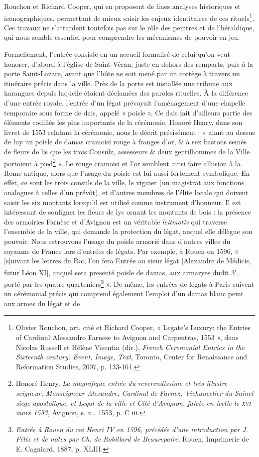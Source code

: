\documentclass[12pt,twoside,openany]{book}
\begin{document}
Rouchon et Richard Cooper, qui en proposent de fines analyses historiques et iconographiques, permettant de mieux saisir les enjeux identitaires de ces rituels\footnote{Olivier Rouchon, art. cité et Richard Cooper, « Legate’s Luxury: the Entries of Cardinal Alessandro Farnese to Avignon and Carpentras, 1553 », dans Nicolas Russell et Hélène Visentin (dir.), \textit{French Ceremonial Entries in the Sixteenth century: Event, Image, Text}, Toronto, Center for Renaissance and Reformation Studies, 2007, p. 133-161.}. Ces travaux ne s’attardent toutefois pas sur le rôle des peintres et de l’héraldique, qui nous semble essentiel pour comprendre les mécanismes de pouvoir en jeu.

Formellement, l’entrée consiste en un accueil formalisé de celui qu’on veut honorer, d’abord à l’église de Saint-Véran, juste en-dehors des remparts, puis à la porte Saint-Lazare, avant que l’hôte ne soit mené par un cortège à travers un itinéraire précis dans la ville. Près de la porte est installée une tribune aux harangues depuis laquelle étaient déclamées des paroles rituelles. À la différence d’une entrée royale, l’entrée d’un légat prévoyait l’aménagement d’une chapelle temporaire sous forme de dais, appelé « poisle ». Ce dais fait d’ailleurs partie des éléments codifiés les plus importants de la cérémonie. Honoré Henry, dans son livret de 1553 relatant la cérémonie, nous le décrit précisément : « aiant au dessus de luy un poisle de damas cramoisi rouge à franges d’or, \& à sex bastons semés de fleurs de lis que les trois Consulz, assesseurs \& deux gentilhommes de la Ville portoient à pied\footnote{Honoré Henry, \textit{La magnifique entrée du reverendissime et très illustre seigneur, Monseigneur Alexandre, Cardinal de Farnez, Vichancelier du Sainct siege apostolique, et Legat de la ville et Cité d’Avignon, faicte en icelle le }\textit{\textsc{xvi}}\textit{ mars 1553}, Avignon, s. n., 1553, p. C iii.} ». Le rouge cramoisi et l’or semblent ainsi faire allusion à la Rome antique, alors que l’usage du poisle est lui aussi fortement symbolique. En effet, ce sont les trois consuls de la ville, le viguier (un magistrat aux fonctions analogues à celles d’un prévôt), et d’autres membres de l’élite locale qui doivent saisir les six montants lorsqu’il est utilisé comme instrument d’honneur. Il est intéressant de souligner les fleurs de lys ornant les montants de bois : la présence des armoiries Farnèse et d’Avignon est un véritable \textit{leitmotiv} qui traverse l’ensemble de la ville, qui demande la protection du légat, auquel elle délègue son pouvoir. Nous retrouvons l’usage du poisle armorié dans d’autres villes du royaume de France lors d’entrées de légats. Par exemple, à Rouen en 1596, « [s]uivant les lettres du Roi, l’on fera Entrée au sieur légat [Alexandre de Médicis, futur Léon XI], auquel sera presenté poisle de damas, aux armaryes dudit 3\textsuperscript{r}, porté par les quatre quarteniers\footnote{\textit{Entrée à Rouen du roi Henri IV en 1596, précédée d’une introduction par J. Félix et de notes par Ch. de Robillard de Beaurepaire}, Rouen, Imprimerie de E. Cagniard, 1887, p. XLIII.} ». De même, les entrées de légats à Paris suivent un cérémonial précis qui comprend également l’emploi d’un damas blanc peint aux armes du légat et de 
\end{document}
